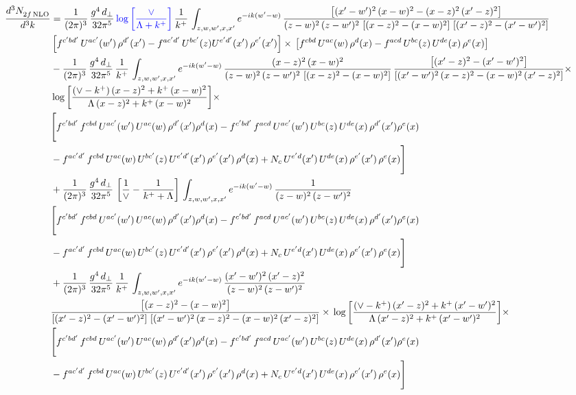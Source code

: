 \documentclass[9pt]{article}
\numberwithin{equation}{section}
\begin{document}
\begin{align}
    \frac{d^{3}N_{2f\,\rm NLO}^{\rm}}{d^{3}k}  & = \frac{1}{(2\pi)^{3}}\, \frac{g^{4}\,d_{\perp}}{32\pi^{5}}\,{\color{blue}\log{\left[\frac{\vee}{\Lambda + k^{+}}\right]}}\,\frac{1}{k^{+}}\,\int_{z,w,w^{\prime},x,x'} e^{-ik(w^{\prime}-w)}\,\frac{\left[(x'-w')^{2}\, (x-w)^{2} - (x-z)^{2}\, (x'-z)^{2}\right]}{(z-w)^{2}\, (z-w')^{2}\,\left[(x-z)^{2} - (x-w)^{2}\right]\, \left[(x'-z)^{2} - (x'-w')^{2}\right]}\notag \\ &   \left[f^{c'bd'}\, U^{ac'}(w')\,\rho^{d'}(x')-f^{ac'd'}\, U^{bc'}(z)U^{e'd'}(x')\, \rho^{e'}(x')\right]\times\, \left[f^{cbd}\, U^{ac}(w)\,\rho^{d}(x) - f^{acd}\, U^{bc}(z)\,U^{de}(x)\, \rho^{e}(x)\right] \notag \\ & - \frac{1}{(2\pi)^{3}}\, \frac{g^{4}\,d_{\perp}}{32\pi^{5}}\,\frac{1}{k^{+}}\,\int_{z,w,w^{\prime},x,x'} e^{-ik(w^{\prime}-w)}\,\frac{(x-z)^{2}\, (x-w)^{2}}{(z-w)^{2}\, (z-w')^{2}\,\left[(x-z)^{2} - (x-w)^{2}\right]}\,\frac{\left[(x'-z)^{2}-(x'-w')^{2}\right]}{\left[(x'-w')^{2}\, (x-z)^{2} - (x-w)^{2}\, (x'-z)^{2}\right]}\times\notag \\ & \log{\left[\frac{(\vee - k^{+})\, (x-z)^{2} + k^{+}\, (x-w)^{2}}{\Lambda\, (x-z)^{2} + k^{+}\, (x-w)^{2}}\right]}\times\notag \\ & \Bigg[f^{c'bd'}\,f^{cbd}\, U^{ac'}(w')\,U^{ac}(w)\,\rho^{d'}(x')\rho^{d}(x)- f^{c'bd'}\,f^{acd}\,U^{ac'}(w')\,U^{bc}(z)\,U^{de}(x)\,\rho^{d'}(x')\rho^{e}(x) \notag \\ & -f^{ac'd'}\,f^{cbd}\,U^{ac}(w)\,U^{bc'}(z)\,U^{e'd'}(x')\,\rho^{e'}(x')\,\rho^{d}(x) +N_{c}\,U^{e'd}(x')\,U^{de}(x)\,\rho^{e'}(x')\,\rho^{e}(x)\Bigg] \notag \\ & + \frac{1}{(2\pi)^{3}}\, \frac{g^{4}\,d_{\perp}}{32\pi^{5}}\,\left[\frac{1}{\vee} - \frac{1}{k^{+} + \Lambda}\right]\,\int_{z,w,w^{\prime},x,x'} e^{-ik(w^{\prime}-w)}\,\frac{1}{(z-w)^{2}\, (z-w')^{2}}\notag \\ & \Bigg[f^{c'bd'}\,f^{cbd}\, U^{ac'}(w')\,U^{ac}(w)\,\rho^{d'}(x')\rho^{d}(x)- f^{c'bd'}\,f^{acd}\,U^{ac'}(w')\,U^{bc}(z)\,U^{de}(x)\,\rho^{d'}(x')\rho^{e}(x) \notag \\ & -f^{ac'd'}\,f^{cbd}\,U^{ac}(w)\,U^{bc'}(z)\,U^{e'd'}(x')\,\rho^{e'}(x')\,\rho^{d}(x) +N_{c}\,U^{e'd}(x')\,U^{de}(x)\,\rho^{e'}(x')\,\rho^{e}(x)\Bigg] \notag \\ & + \frac{1}{(2\pi)^{3}}\, \frac{g^{4}\,d_{\perp}}{32\pi^{5}}\,\frac{1}{k^{+}}\,\int_{z,w,w^{\prime},x,x'} e^{-ik(w^{\prime}-w)}\,\frac{(x'-w')^{2}\, (x'-z)^{2}}{(z-w)^{2}\, (z-w')^{2}}\notag \\ & \frac{\left[(x-z)^{2} - (x-w)^{2}\right]}{\left[(x'-z)^{2} - (x'-w')^{2}\right]\, \left[(x'-w')^{2}\, (x - z)^{2} - (x-w)^{2}\,(x'-z)^{2}\right]}\times\, \log{\left[\frac{(\vee - k^{+})\, (x'-z)^{2} + k^{+}\, (x'-w')^{2}}{\Lambda\, (x'-z)^{2} + k^{+}\, (x'-w')^{2}}\right]}\times \notag \\ &  \Bigg[f^{c'bd'}\,f^{cbd}\, U^{ac'}(w')\,U^{ac}(w)\,\rho^{d'}(x')\rho^{d}(x)- f^{c'bd'}\,f^{acd}\,U^{ac'}(w')\,U^{bc}(z)\,U^{de}(x)\,\rho^{d'}(x')\rho^{e}(x) \notag \\ & -f^{ac'd'}\,f^{cbd}\,U^{ac}(w)\,U^{bc'}(z)\,U^{e'd'}(x')\,\rho^{e'}(x')\,\rho^{d}(x) +N_{c}\,U^{e'd}(x')\,U^{de}(x)\,\rho^{e'}(x')\,\rho^{e}(x)\Bigg]
\end{align}
\end{document}
